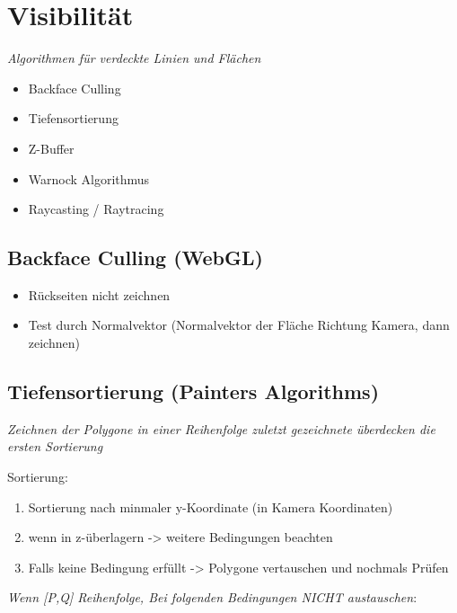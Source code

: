 \section{Visibilität}

\textit{Algorithmen für verdeckte Linien und Flächen}

\begin{itemize}
  \item Backface Culling
  \item Tiefensortierung
  \item Z-Buffer
  \item Warnock Algorithmus
  \item Raycasting / Raytracing
\end{itemize}

\subsection{Backface Culling (WebGL)}

\begin{itemize}
  \item Rückseiten nicht zeichnen
  \item Test durch Normalvektor (Normalvektor der Fläche Richtung Kamera, dann zeichnen)
\end{itemize}

\subsection{Tiefensortierung (Painters Algorithms)}

\textit{Zeichnen der Polygone in einer Reihenfolge zuletzt gezeichnete überdecken die ersten Sortierung}

Sortierung:
\begin{enumerate}
  \item Sortierung nach minmaler y-Koordinate (in Kamera Koordinaten)
  \item wenn in z-überlagern -> weitere Bedingungen beachten
  \item Falls keine Bedingung erfüllt -> Polygone vertauschen und nochmals Prüfen
\end{enumerate}

\textit{Wenn [P,Q] Reihenfolge, Bei folgenden Bedingungen NICHT austauschen}:\\

